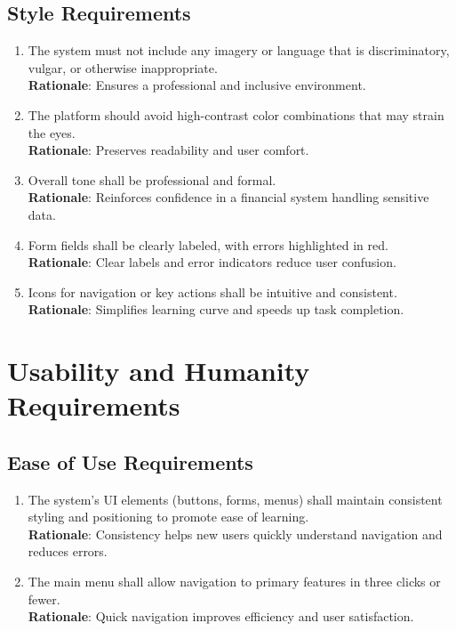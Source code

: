 \documentclass[12pt]{article}
\begin{document}
\subsection{Style Requirements}
\begin{enumerate}
  \item The system must not include any imagery or language that is discriminatory, vulgar, or otherwise inappropriate. \\
  \textbf{Rationale}: Ensures a professional and inclusive environment.
  \item The platform should avoid high-contrast color combinations that may strain the eyes. \\
  \textbf{Rationale}: Preserves readability and user comfort.
  \item Overall tone shall be professional and formal. \\
  \textbf{Rationale}: Reinforces confidence in a financial system handling sensitive data.
  \item Form fields shall be clearly labeled, with errors highlighted in red. \\
  \textbf{Rationale}: Clear labels and error indicators reduce user confusion.
  \item Icons for navigation or key actions shall be intuitive and consistent. \\
  \textbf{Rationale}: Simplifies learning curve and speeds up task completion.
\end{enumerate}

\section{Usability and Humanity Requirements}
\subsection{Ease of Use Requirements}
\begin{enumerate}
  \item The system’s UI elements (buttons, forms, menus) shall maintain consistent styling and positioning to promote ease of learning. \\
  \textbf{Rationale}: Consistency helps new users quickly understand navigation and reduces errors.
  \item The main menu shall allow navigation to primary features in three clicks or fewer. \\
  \textbf{Rationale}: Quick navigation improves efficiency and user satisfaction.
\end{enumerate}
\end{document}
